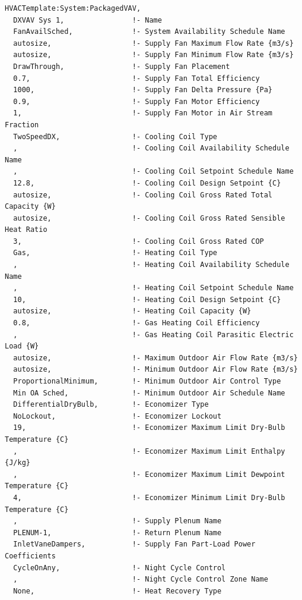 \begin{lstlisting}
HVACTemplate:System:PackagedVAV,
  DXVAV Sys 1,                !- Name
  FanAvailSched,              !- System Availability Schedule Name
  autosize,                   !- Supply Fan Maximum Flow Rate {m3/s}
  autosize,                   !- Supply Fan Minimum Flow Rate {m3/s}
  DrawThrough,                !- Supply Fan Placement
  0.7,                        !- Supply Fan Total Efficiency
  1000,                       !- Supply Fan Delta Pressure {Pa}
  0.9,                        !- Supply Fan Motor Efficiency
  1,                          !- Supply Fan Motor in Air Stream Fraction
  TwoSpeedDX,                 !- Cooling Coil Type
  ,                           !- Cooling Coil Availability Schedule Name
  ,                           !- Cooling Coil Setpoint Schedule Name
  12.8,                       !- Cooling Coil Design Setpoint {C}
  autosize,                   !- Cooling Coil Gross Rated Total Capacity {W}
  autosize,                   !- Cooling Coil Gross Rated Sensible Heat Ratio
  3,                          !- Cooling Coil Gross Rated COP
  Gas,                        !- Heating Coil Type
  ,                           !- Heating Coil Availability Schedule Name
  ,                           !- Heating Coil Setpoint Schedule Name
  10,                         !- Heating Coil Design Setpoint {C}
  autosize,                   !- Heating Coil Capacity {W}
  0.8,                        !- Gas Heating Coil Efficiency
  ,                           !- Gas Heating Coil Parasitic Electric Load {W}
  autosize,                   !- Maximum Outdoor Air Flow Rate {m3/s}
  autosize,                   !- Minimum Outdoor Air Flow Rate {m3/s}
  ProportionalMinimum,        !- Minimum Outdoor Air Control Type
  Min OA Sched,               !- Minimum Outdoor Air Schedule Name
  DifferentialDryBulb,        !- Economizer Type
  NoLockout,                  !- Economizer Lockout
  19,                         !- Economizer Maximum Limit Dry-Bulb Temperature {C}
  ,                           !- Economizer Maximum Limit Enthalpy {J/kg}
  ,                           !- Economizer Maximum Limit Dewpoint Temperature {C}
  4,                          !- Economizer Minimum Limit Dry-Bulb Temperature {C}
  ,                           !- Supply Plenum Name
  PLENUM-1,                   !- Return Plenum Name
  InletVaneDampers,           !- Supply Fan Part-Load Power Coefficients
  CycleOnAny,                 !- Night Cycle Control
  ,                           !- Night Cycle Control Zone Name
  None,                       !- Heat Recovery Type

\end{lstlisting}
